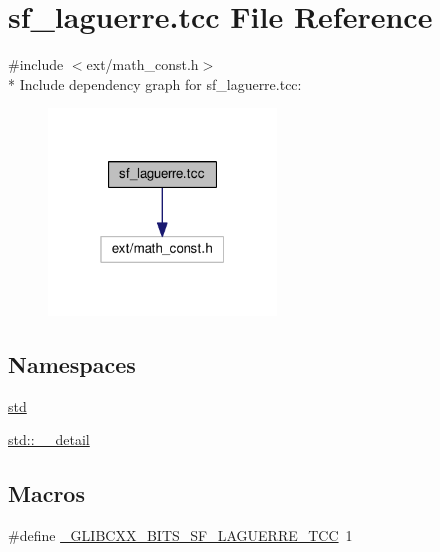 \hypertarget{sf__laguerre_8tcc}{}\section{sf\+\_\+laguerre.\+tcc File Reference}
\label{sf__laguerre_8tcc}
{\ttfamily \#include $<$ext/math\+\_\+const.\+h$>$}\\*
Include dependency graph for sf\+\_\+laguerre.\+tcc\+:
\nopagebreak
\begin{figure}[H]
\begin{center}
\leavevmode
\includegraphics[width=172pt]{sf__laguerre_8tcc__incl}
\end{center}
\end{figure}
\subsection*{Namespaces}
\begin{DoxyCompactItemize}
\item 
 \hyperlink{namespacestd}{std}
\item 
 \hyperlink{namespacestd_1_1____detail}{std\+::\+\_\+\+\_\+detail}
\end{DoxyCompactItemize}
\subsection*{Macros}
\begin{DoxyCompactItemize}
\item 
\#define \hyperlink{sf__laguerre_8tcc_a6d5a7e97abaa68b4a97764d871fb5314}{\+\_\+\+G\+L\+I\+B\+C\+X\+X\+\_\+\+B\+I\+T\+S\+\_\+\+S\+F\+\_\+\+L\+A\+G\+U\+E\+R\+R\+E\+\_\+\+T\+C\+C}~1
\end{DoxyCompactItemize}
